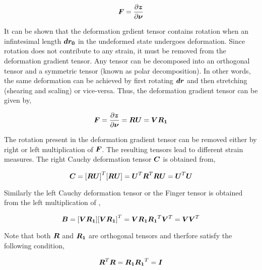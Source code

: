 \begin{equation}
  \matr{F}=\delby{\vect{z}}{\vect{\nu}}
  \label{eqn:deformationgradienttensor}
\end{equation}
 
It can be shown that the deformation grdient tensor contains rotation when an infintesimal length $\vect{dr_{0}}$ in the undeformed state undergoes 
deformation. Since rotation does not contribute to any strain, it must be removed from the deformation gradient tensor. Any tensor can be decomposed 
into an orthogonal tensor and a symmetric tensor (known as polar decomposition). In other words, the same deformation can be achieved by first 
rotating $\vect{dr}$ and then stretching (shearing and scaling) or vice-versa. Thus, the deformation gradient tensor can be given by,

\begin{equation}
  \matr{F}=\delby{\vect{z}}{\vect{\nu}}=\matr{R}\matr{U}=\matr{V}\matr{R_{1}}
  \label{eqn:polardecomposition}
\end{equation}
 
The rotation present in the deformation gradient tensor can be removed either by right or left multiplication of $\matr{F}$. The resulting tensors 
lead to different strain measures. The right Cauchy deformation tensor $\matr{C}$ is obtained from,

\begin{equation}
  \matr{C}=\transpose{[\matr{R}\matr{U}]}[\matr{R}\matr{U}]=\transpose{\matr{U}}\transpose{\matr{R}}\matr{R}\matr{U}=\transpose{\matr{U}}\matr{U}
  \label{eqn:rightcauchy}
\end{equation}

Similarly the left Cauchy deformation tensor or the Finger tensor  is obtained from the left multiplication of ,

\begin{equation}
  \matr{B}=[\matr{V}\matr{R_{1}}]\transpose{[\matr{V}\matr{R_{1}}]}=\matr{V}\matr{R_{1}}\transpose{\matr{R_{1}}}\transpose{\matr{V}}=\matr{V}\transpose{\matr{V}}
  \label{eqn:leftcauchy}
\end{equation}

\noindent Note that both $\matr{R}$ and $\matr{R_{1}}$ are orthogonal tensors and therfore satisfy the following condition,

\begin{equation}
  \transpose{\matr{R}}\matr{R}=\matr{R_{1}}\transpose{\matr{R_{1}}}=\matr{I}
  \label{eqn:orthoganality}
\end{equation}

